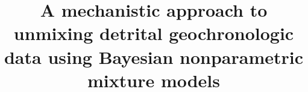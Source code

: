 %
%
%
%
%
%
\RequirePackage{fix-cm}
%
\documentclass[smallextended]{svjour3}       %
%
\smartqed  %
%
\usepackage{graphicx}
%
%
\usepackage{url}
\usepackage{hyperref}
\usepackage{amsmath}
\usepackage{float}
\usepackage{subcaption}
\captionsetup{compatibility=false}
\usepackage{setspace}
\usepackage{lineno}
\usepackage{textcomp}
\usepackage{gensymb}
%
\usepackage{xcolor} %
%
\newcommand\numberthis{\addtocounter{equation}{1}\tag{\theequation}}
%
%
%


\title{A mechanistic approach to unmixing detrital geochronologic data using Bayesian nonparametric mixture models%
}
\subtitle{}


